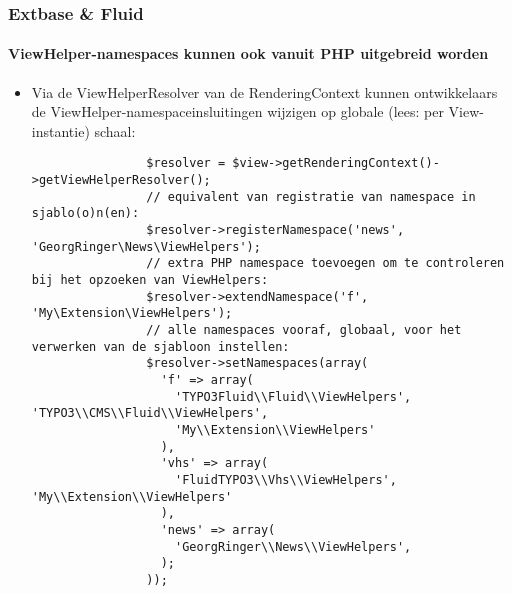 \begin{frame}[fragile]
	\frametitle{Extbase \& Fluid}
	\framesubtitle{ViewHelper-namespaces kunnen ook vanuit PHP uitgebreid worden}

	\lstset{basicstyle=\tiny\ttfamily}

	\begin{itemize}

		\item Via de ViewHelperResolver van de RenderingContext kunnen ontwikkelaars
			de ViewHelper-namespaceinsluitingen wijzigen op globale (lees: per
			View-instantie) schaal:

			\begin{lstlisting}
				$resolver = $view->getRenderingContext()->getViewHelperResolver();
				// equivalent van registratie van namespace in sjablo(o)n(en):
				$resolver->registerNamespace('news', 'GeorgRinger\News\ViewHelpers');
				// extra PHP namespace toevoegen om te controleren bij het opzoeken van ViewHelpers:
				$resolver->extendNamespace('f', 'My\Extension\ViewHelpers');
				// alle namespaces vooraf, globaal, voor het verwerken van de sjabloon instellen:
				$resolver->setNamespaces(array(
				  'f' => array(
				    'TYPO3Fluid\\Fluid\\ViewHelpers', 'TYPO3\\CMS\\Fluid\\ViewHelpers',
				    'My\\Extension\\ViewHelpers'
				  ),
				  'vhs' => array(
				    'FluidTYPO3\\Vhs\\ViewHelpers', 'My\\Extension\\ViewHelpers'
				  ),
				  'news' => array(
				    'GeorgRinger\\News\\ViewHelpers',
				  );
				));
			\end{lstlisting}
	\end{itemize}

\end{frame}


